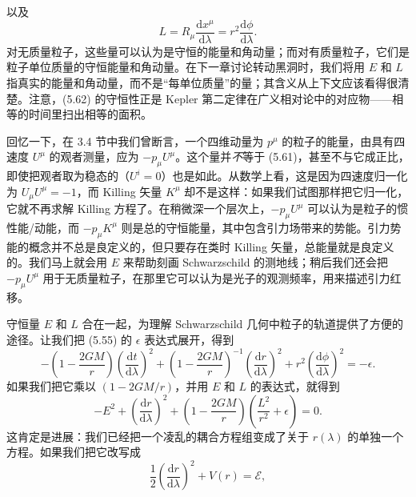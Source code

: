以及
\begin{equation*}
L = R_\mu\frac{\mathrm{d}x^\mu}{\mathrm{d}\lambda} = r^2\frac{\mathrm{d}\phi}{\mathrm{d}\lambda}.
\tag{5.62}
\end{equation*}
对无质量粒子，这些量可以认为是守恒的能量和角动量；而对有质量粒子，它们是粒子单位质量的守恒能量和角动量。在下一章讨论转动黑洞时，我们将用 $E$ 和 $L$ 指真实的能量和角动量，而不是“每单位质量”的量；其含义从上下文应该看得很清楚。注意，(5.62) 的守恒性正是 Kepler 第二定律在广义相对论中的对应物——相等的时间里扫出相等的面积。

回忆一下，在 3.4 节中我们曾断言，一个四维动量为 $p^\mu$ 的粒子的能量，由具有四速度 $U^\mu$ 的观者测量，应为 $-p_\mu U^\mu$。这个量并\emph{不}等于 (5.61)，甚至不与它成正比，即使把观者取为稳态的（$U^i = 0$）也是如此。从数学上看，这是因为四速度归一化为 $U_\mu U^\mu = -1$，而 Killing 矢量 $K^\mu$ 却不是这样：如果我们试图那样把它归一化，它就不再求解 Killing 方程了。在稍微深一个层次上，$-p_\mu U^\mu$ 可以认为是粒子的惯性能/动能，而 $-p_\mu K^\mu$ 则是总的守恒能量，其中包含引力场带来的势能。引力势能的概念并不总是良定义的，但只要存在类时 Killing 矢量，总能量就是良定义的。我们马上就会用 $E$ 来帮助刻画 Schwarzschild 的测地线；稍后我们还会把 $-p_\mu U^\mu$ 用于无质量粒子，在那里它可以认为是光子的观测频率，用来描述引力红移。

守恒量 $E$ 和 $L$ 合在一起，为理解 Schwarzschild 几何中粒子的轨道提供了方便的途径。让我们把 (5.55) 的 $\epsilon$ 表达式展开，得到
\begin{equation*}
-\left(1-\frac{2GM}{r}\right)\left(\frac{\mathrm{d}t}{\mathrm{d}\lambda}\right)^2 + \left(1-\frac{2GM}{r}\right)^{-1}\left(\frac{\mathrm{d}r}{\mathrm{d}\lambda}\right)^2 + r^2\left(\frac{\mathrm{d}\phi}{\mathrm{d}\lambda}\right)^2 = -\epsilon.
\tag{5.63}
\end{equation*}
如果我们把它乘以 $(1-2GM/r)$，并用 $E$ 和 $L$ 的表达式，就得到
\begin{equation*}
-E^2 + \left(\frac{\mathrm{d}r}{\mathrm{d}\lambda}\right)^2 + \left(1-\frac{2GM}{r}\right)\left(\frac{L^2}{r^2}+\epsilon\right) = 0.
\tag{5.64}
\end{equation*}
这肯定是进展：我们已经把一个凌乱的耦合方程组变成了关于 $r(\lambda)$ 的单独一个方程。如果我们把它改写成
\begin{equation*}
\frac{1}{2}\left(\frac{\mathrm{d}r}{\mathrm{d}\lambda}\right)^2 + V(r) = \mathcal{E},
\tag{5.65}
\end{equation*}

